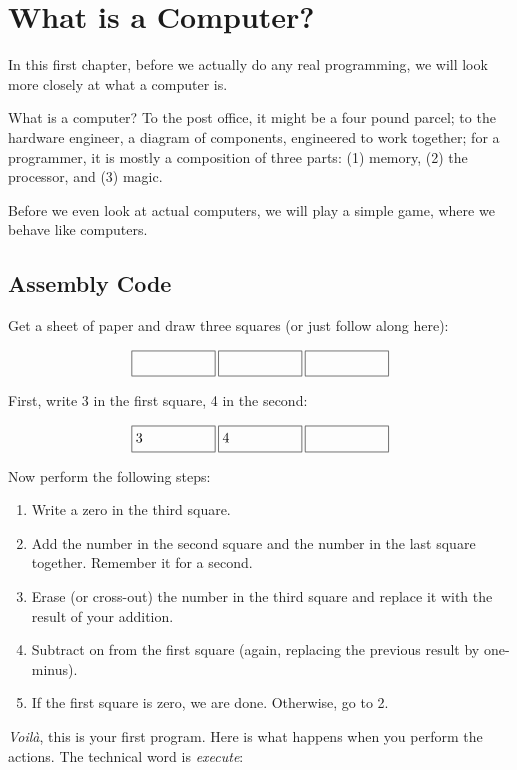 \chapter{What is a Computer?}

In this first chapter, before we actually do any real programming, we will look
more closely at what a computer is.

What is a computer? To the post office, it might be a four pound parcel; to the
hardware engineer, a diagram of components, engineered to work together; for a
programmer, it is mostly a composition of three parts: (1) memory, (2) the
processor, and (3) magic.

Before we even look at actual computers, we will play a simple game, where we
behave like computers.

\section{Assembly Code}%
\newcommand\dorect[1]{\framebox[6em]{\ensuremath{#1}\strut\hfill}}%
\newcommand\dostate[3]{\dorect{#1}\hspace{2pt}\dorect{#2}\hspace{2pt}\dorect{#3}}

Get a sheet of paper and draw three squares (or just follow along here):

\[
\dostate{}{}{}
\]

First, write 3 in the first square, 4 in the second:

\[
\dostate{3}{4}{\strut}
\]

Now perform the following steps:

\begin{enumerate}
\item Write a zero in the third square.
\item Add the number in the second square and the number in the last square
together. Remember it for a second.
\item Erase (or cross-out) the number in the third square and replace it with
the result of your addition.
\item Subtract on from the first square (again, replacing the previous result
by one-minus).
\item If the first square is zero, we are done. Otherwise, go to 2.
\end{enumerate}

\emph{Voilà}, this is your first program. Here is what happens when you perform
the actions. The technical word is \emph{execute}:

